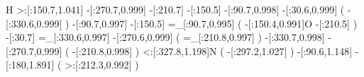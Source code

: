                     H%
    >:[:150.7,1.041]%
     -[:270.7,0.999]%
           -[:210.7]%
           -[:150.5]%
      -[:90.7,0.998]%
      -[:30.6,0.999]%
                       (
         -[:330.6,0.999]%
                       )
      -[:90.7,0.997]%
           -[:150.5]%
     =_[:90.7,0.995]%
                       (
         -[:150.4,0.991]O%
               -[:210.5]%
                       )
            -[:30.7]%
    =_[:330.6,0.997]%
     -[:270.6,0.999]%
                       (
        =_[:210.8,0.997]%
                       )
     -[:330.7,0.998]%
     -[:270.7,0.999]%
                       (
         -[:210.8,0.998]%
                       )
    <:[:327.8,1.198]N%
                       (
         -[:297.2,1.027]%
                       )
      -[:90.6,1.148]%
       -[:180,1.891]%
                       (
        >:[:212.3,0.992]%
                       )